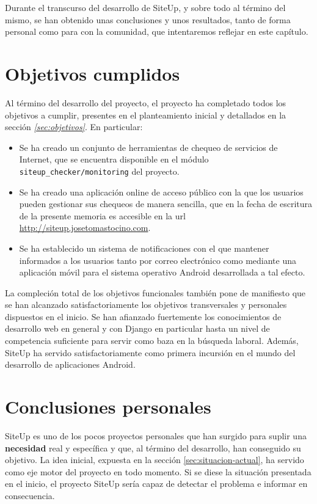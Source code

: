 Durante el transcurso del desarrollo de SiteUp, y sobre todo al término del
mismo, se han obtenido unas conclusiones y unos resultados, tanto de forma
personal como para con la comunidad, que intentaremos reflejar en este capítulo.


\section{Objetivos cumplidos}
Al término del desarrollo del proyecto, el proyecto ha completado todos los
objetivos a cumplir, presentes en el planteamiento inicial y detallados en la
sección \textit{\ref{sec:objetivos}}. En particular:

\begin{itemize}
\item Se ha creado un conjunto de herramientas de chequeo de servicios de
  Internet, que se encuentra disponible en el módulo
  \texttt{siteup\_checker/monitoring} del proyecto.
\item Se ha creado una aplicación online de acceso público con la que los
  usuarios pueden gestionar sus chequeos de manera sencilla, que en la fecha de
  escritura de la presente memoria es accesible en la url
  \url{http://siteup.josetomastocino.com}.
\item Se ha establecido un sistema de notificaciones con el que mantener
  informados a los usuarios tanto por correo electrónico como mediante una
  aplicación móvil para el sistema operativo Android desarrollada a tal efecto.
\end{itemize}

La compleción total de los objetivos funcionales también pone de manifiesto que
se han alcanzado satisfactoriamente los objetivos transversales y personales
dispuestos en el inicio. Se han afianzado fuertemente los conocimientos de
desarrollo web en general y con Django en particular hasta un nivel de
competencia suficiente para servir como baza en la búsqueda laboral. Además,
SiteUp ha servido satisfactoriamente como primera incursión en el mundo del
desarrollo de aplicaciones Android.

\section{Conclusiones personales}

SiteUp es uno de los pocos proyectos personales que han surgido para suplir una
\textbf{necesidad} real y específica y que, al término del desarrollo, han
conseguido su objetivo. La idea inicial, expuesta en la sección
\ref{sec:situacion-actual}, ha servido como eje motor del proyecto en todo
momento. Si se diese la situación presentada en el inicio, el proyecto SiteUp
sería capaz de detectar el problema e informar en consecuencia. 

